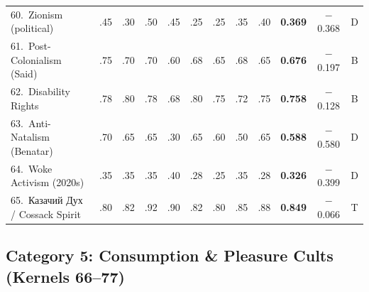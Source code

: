 \documentclass[11pt,a4paper]{article}
\theoremstyle{definition}
\theoremstyle{remark}
\begin{document}
\begin{longtable}{@{}l|cccccccc|cc|c@{}}
60.\ Zionism (political)
  & .45 & .30 & .50 & .45 & .25 & .25 & .35 & .40
  & \textbf{0.369} & $-$0.368 & \textcolor{collapse}{D} \\
61.\ Post-Colonialism (Said)
  & .75 & .70 & .70 & .60 & .68 & .65 & .68 & .65
  & \textbf{0.676} & $-$0.197 & \textcolor{borderline}{B} \\
62.\ Disability Rights
  & .78 & .80 & .78 & .68 & .80 & .75 & .72 & .75
  & \textbf{0.758} & $-$0.128 & \textcolor{borderline}{B} \\
63.\ Anti-Natalism (Benatar)
  & .70 & .65 & .65 & .30 & .65 & .60 & .50 & .65
  & \textbf{0.588} & $-$0.580 & \textcolor{collapse}{D} \\
64.\ Woke Activism (2020s)
  & .35 & .35 & .35 & .40 & .28 & .25 & .35 & .28
  & \textbf{0.326} & $-$0.399 & \textcolor{collapse}{D} \\
65.\ \foreignlanguage{russian}{Казачий Дух / Cossack Spirit}
  & .80 & .82 & .92 & .90 & .82 & .80 & .85 & .88
  & \textbf{0.849} & $-$0.066 & \textcolor{survival}{T} \\

\end{longtable}

\subsection{Category 5: Consumption \& Pleasure Cults
  (Kernels 66--77)}
\label{sec:cat5}
\end{document}
